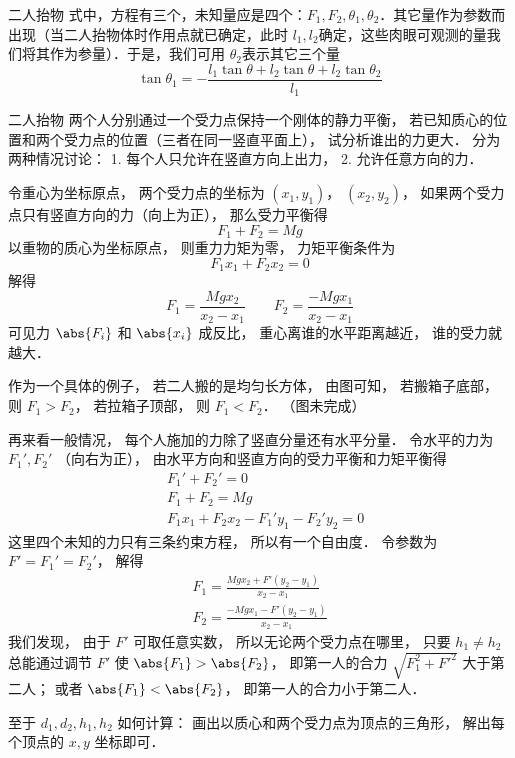\begin{example}{二人抬物}
式中，方程有三个，未知量应是四个：$F_1,F_2,\theta_1,\theta_2$．其它量作为参数而出现（当二人抬物体时作用点就已确定，此时 $l_1,l_2$确定，这些肉眼可观测的量我们将其作为参量）．于是，我们可用 $\theta_2$表示其它三个量
\begin{equation}
\tan\theta_1=-\frac {l_1
 \tan  \theta +l_2\tan\theta +l_2\tan
\theta_2}{l_1}
\end{equation}
\end{example}

\begin{example}{二人抬物}
两个人分别通过一个受力点保持一个刚体的静力平衡， 若已知质心的位置和两个受力点的位置（三者在同一竖直平面上）， 试分析谁出的力更大． 分为两种情况讨论： 1. 每个人只允许在竖直方向上出力， 2. 允许任意方向的力．

令重心为坐标原点， 两个受力点的坐标为 $(x_1, y_1)$， $(x_2, y_2)$， 如果两个受力点只有竖直方向的力（向上为正）， 那么受力平衡得
\begin{equation}
F_1 + F_2 = Mg
\end{equation}
以重物的质心为坐标原点， 则重力力矩为零， 力矩平衡条件为
\begin{equation}
F_1 x_1 + F_2 x_2 = 0
\end{equation}
解得
\begin{equation}
F_1 = \frac{Mg x_2}{x_2 - x_1} \qquad F_2 = \frac{-Mg x_1}{x_2 - x_1}
\end{equation}
可见力 $\abs{F_i}$ 和 $\abs{x_i}$ 成反比， 重心离谁的水平距离越近， 谁的受力就越大．

作为一个具体的例子， 若二人搬的是均匀长方体， 由图可知， 若搬箱子底部， 则 $F_1 > F_2$， 若拉箱子顶部， 则 $F_1 < F_2$． （图未完成）

再来看一般情况， 每个人施加的力除了竖直分量还有水平分量． 令水平的力为 $F_1', F_2'$ （向右为正）， 由水平方向和竖直方向的受力平衡和力矩平衡得
\begin{equation}
\begin{aligned}
&F_1' + F_2' = 0\\
&F_1 + F_2 = Mg\\
&F_1 x_1 + F_2 x_2 - F_1' y_1 - F_2' y_2 = 0
\end{aligned}
\end{equation}
这里四个未知的力只有三条约束方程， 所以有一个自由度． 令参数为 $F' = F_1' = F_2'$， 解得
\begin{equation}
\begin{aligned}
F_1 = \frac{Mg x_2 + F'(y_2 - y_1)}{x_2 - x_1}\\
F_2 = \frac{-Mg x_1 - F'(y_2 - y_1)}{x_2 - x_1}
\end{aligned}
\end{equation}
我们发现， 由于 $F'$ 可取任意实数， 所以无论两个受力点在哪里， 只要 $h_1 \ne h_2$ 总能通过调节 $F'$ 使 $\abs{F_1} > \abs{F_2}$， 即第一人的合力 $\sqrt{F_1^2 + F'^2}$ 大于第二人； 或者 $\abs{F_1} < \abs{F_2}$， 即第一人的合力小于第二人．

至于 $d_1, d_2, h_1, h_2$ 如何计算： 画出以质心和两个受力点为顶点的三角形， 解出每个顶点的 $x, y$ 坐标即可．
\end{example}

